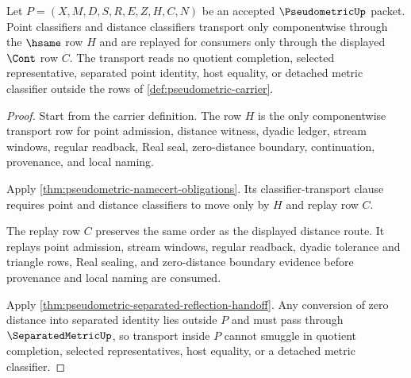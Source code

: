 \begin{theorem}
\label{thm:pseudometric-classifier-transport-obligation}
Let $P=(X,M,D,S,R,E,Z,H,C,N)$ be an accepted $\PseudometricUp$ packet. Point classifiers and distance classifiers transport only componentwise through the $\hsame$ row $H$ and are replayed for consumers only through the displayed $\Cont$ row $C$. The transport reads no quotient completion, selected representative, separated point identity, host equality, or detached metric classifier outside the rows of \autoref{def:pseudometric-carrier}.
\end{theorem}
\begin{proof}
Start from the carrier definition. The row $H$ is the only componentwise transport row for point admission, distance witness, dyadic ledger, stream windows, regular readback, Real seal, zero-distance boundary, continuation, provenance, and local naming.

Apply \autoref{thm:pseudometric-namecert-obligations}. Its classifier-transport clause requires point and distance classifiers to move only by $H$ and replay row $C$.

The replay row $C$ preserves the same order as the displayed distance route. It replays point admission, stream windows, regular readback, dyadic tolerance and triangle rows, Real sealing, and zero-distance boundary evidence before provenance and local naming are consumed.

Apply \autoref{thm:pseudometric-separated-reflection-handoff}. Any conversion of zero distance into separated identity lies outside $P$ and must pass through $\SeparatedMetricUp$, so transport inside $P$ cannot smuggle in quotient completion, selected representatives, host equality, or a detached metric classifier.
\end{proof}

